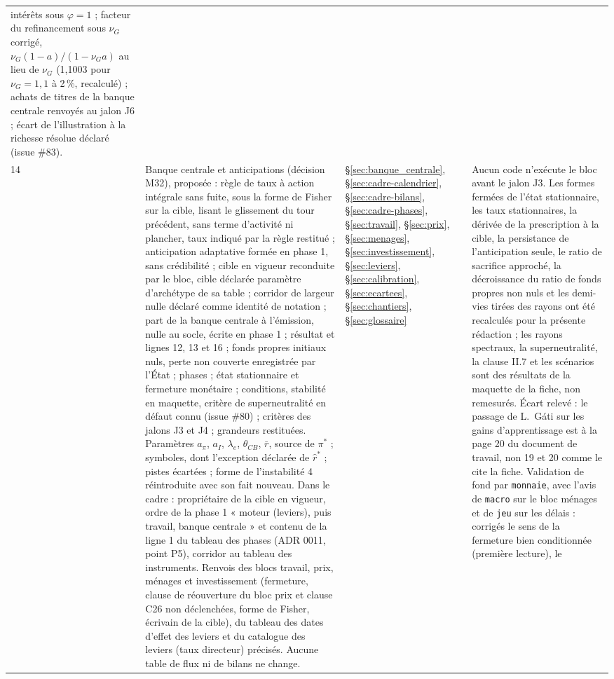 \documentclass[11pt,a4paper]{article}
\begin{document}
\begin{center}
\begin{longtable}{p{0.5cm}>{\raggedright\arraybackslash}p{6.3cm}>{\raggedright\arraybackslash}p{2.1cm}>{\raggedright\arraybackslash}p{5.8cm}}
intérêts sous $\varphi = 1$ ; facteur du refinancement sous $\nu_G$ corrigé, $\nu_G(1 - a)/(1 - \nu_G a)$ au lieu de $\nu_G$ (1,1003 pour $\nu_G = 1{,}1$ à 2\,\%, recalculé) ; achats de titres de la banque centrale renvoyés au jalon J6 ; écart de l'illustration à la richesse résolue déclaré (issue \#83).\\
14 & Banque centrale et anticipations (décision M32), proposée : règle de taux à action intégrale sans fuite, sous la forme de Fisher sur la cible, lisant le glissement du tour précédent, sans terme d'activité ni plancher, taux indiqué par la règle restitué ; anticipation adaptative formée en phase 1, sans crédibilité ; cible en vigueur reconduite par le bloc, cible déclarée paramètre d'archétype de sa table ; corridor de largeur nulle déclaré comme identité de notation ; part de la banque centrale à l'émission, nulle au socle, écrite en phase 1 ; résultat et lignes 12, 13 et 16 ; fonds propres initiaux nuls, perte non couverte enregistrée par l'État ; phases ; état stationnaire et fermeture monétaire ; conditions, stabilité en maquette, critère de superneutralité en défaut connu (issue \#80) ; critères des jalons J3 et J4 ; grandeurs restituées. Paramètres $a_\pi$, $a_I$, $\lambda_e$, $\theta_{\mathit{CB}}$, $\bar r$, source de $\pi^\ast$ ; symboles, dont l'exception déclarée de $\hat r^\ast$ ; pistes écartées ; forme de l'instabilité 4 réintroduite avec son fait nouveau. Dans le cadre : propriétaire de la cible en vigueur, ordre de la phase 1 « moteur (leviers), puis travail, banque centrale » et contenu de la ligne 1 du tableau des phases (ADR 0011, point P5), corridor au tableau des instruments. Renvois des blocs travail, prix, ménages et investissement (fermeture, clause de réouverture du bloc prix et clause C26 non déclenchées, forme de Fisher, écrivain de la cible), du tableau des dates d'effet des leviers et du catalogue des leviers (taux directeur) précisés. Aucune table de flux ni de bilans ne change. & \S\ref{sec:banque_centrale}, \S\ref{sec:cadre-calendrier}, \S\ref{sec:cadre-bilans}, \S\ref{sec:cadre-phases}, \S\ref{sec:travail}, \S\ref{sec:prix}, \S\ref{sec:menages}, \S\ref{sec:investissement}, \S\ref{sec:leviers}, \S\ref{sec:calibration}, \S\ref{sec:ecartees}, \S\ref{sec:chantiers}, \S\ref{sec:glossaire} & Aucun code n'exécute le bloc avant le jalon J3. Les formes fermées de l'état stationnaire, les taux stationnaires, la dérivée de la prescription à la cible, la persistance de l'anticipation seule, le ratio de sacrifice approché, la décroissance du ratio de fonds propres non nuls et les demi-vies tirées des rayons ont été recalculés pour la présente rédaction ; les rayons spectraux, la superneutralité, la clause II.7 et les scénarios sont des résultats de la maquette de la fiche, non remesurés. Écart relevé : le passage de L.~Gáti sur les gains d'apprentissage est à la page 20 du document de travail, non 19 et 20 comme le cite la fiche. Validation de fond par \texttt{monnaie}, avec l'avis de \texttt{macro} sur le bloc ménages et de \texttt{jeu} sur les délais : corrigés le sens de la fermeture bien conditionnée (première lecture), le 
\end{longtable}
\end{center}
\end{document}
